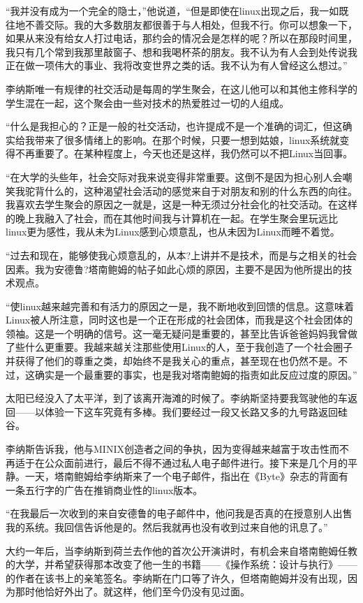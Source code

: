 “我并没有成为一个完全的隐士，”他说道，“但是即使在linux出现之后，我一如既往地不善交际。我的大多数朋友都很善于与人相处，但我不行。你可以想象一下，如果从来没有给女人打过电话，那约会的情况会是怎样的呢？所以在那段时间里，我只有几个常到我那里敲窗子、想和我喝杯茶的朋友。我不认为有人会到处传说我正在做一项伟大的事业、我将改变世界之类的话。我不认为有人曾经这么想过。”

李纳斯唯一有规律的社交活动是每周的学生聚会，在这儿他可以和其他主修科学的学生混在一起，这个聚会由一些对技术的热爱胜过一切的人组成。

“什么是我担心的？正是一般的社交活动，也许提成不是一个准确的词汇，但这确实给我带来了很多情绪上的影响。在那个时候，只要一想到姑娘，linux系统就变得不再重要了。在某种程度上，今天也还是这样，我仍然可以不把Linux当回事。

“在大学的头些年，社会交际对我来说变得非常重要。这倒不是因为担心别人会嘲笑我驼背什么的，这种渴望社会活动的感觉来自于对朋友和别的什么东西的向往。我喜欢去学生聚会的原因之一就是，这是一种无须过分社会化的社交活动。在这样的晚上我融入了社会，而在其他时间我与计算机在一起。在学生聚会里玩远比linux更为感性，我从未为Linux感到心烦意乱，也从未因为Linux而睡不着觉。

“过去和现在，能够使我心烦意乱的，从本?上讲并不是技术，而是与之相关的社会因素。我为安德鲁?塔南鲍姆的帖子如此心烦的原因，主要不是因为他所提出的技术观点。

“使linux越来越完善和有活力的原因之一是，我不断地收到回馈的信息。这意味着Linux被人所注意，同时这也是一个正在形成的社会团体，而我是这个社会团体的领袖。这是一个明确的信号。这一毫无疑问是重要的，甚至比告诉爸爸妈妈我曾做了些什么更重要。我越来越关注那些使用Linux的人，至于我创造了一个社会圈子并获得了他们的尊重之类，却始终不是我关心的重点，甚至现在也仍然不是。不过，这确实是一个最重要的事实，也是我对塔南鲍姆的指责如此反应过度的原因。”

太阳已经没入了太平洋，到了该离开海滩的时候了。李纳斯坚持要我驾驶他的车返回——以体验一下这车究竟有多棒。我们要经过一段又长路又多的九号路返回硅谷。

李纳斯告诉我，他与MINIX创造者之间的争执，因为变得越来越富于攻击性而不再适于在公众面前进行，最后不得不通过私人电子邮件进行。接下来是几个月的平静。一天，塔南鲍姆给李纳斯来了一个电子邮件，指出在《Byte》杂志的背面有一条五行字的广告在推销商业性的linux版本。

“在我最后一次收到的来自安德鲁的电子邮件中，他问我是否真的在授意别人出售我的系统。我回信告诉他是的。然后我就再也没有收到过来自他的讯息了。”

大约一年后，当李纳斯到荷兰去作他的首次公开演讲时，有机会来自塔南鲍姆任教的大学，并希望获得那本改变了他一生的书籍——《操作系统：设计与执行》——的作者在该书上的亲笔签名。李纳斯在门口等了许久，但塔南鲍姆并没有出现，因为那时他恰好外出了。就这样，他们至今仍没有见过面。

